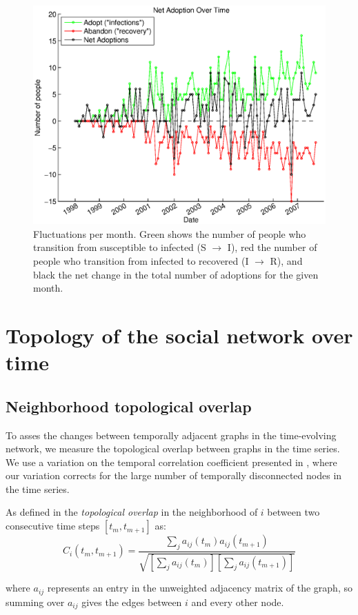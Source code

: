 \documentclass[12pt]{article}
\begin{document}
\begin{figure}[H]
\centering
\includegraphics[width = .7\textwidth]{Graficos/trans.eps}
\caption{Fluctuations per month. Green shows the number of people who transition from susceptible to infected (S \(\rightarrow\) I), red the number of people who transition from infected to recovered (I \(\rightarrow\) R), and black the net change in the total number of adoptions for the given month.}
\label{fig:trans}
\end{figure}

\section{Topology of the social network over time}

\subsection{Neighborhood topological overlap}

To asses the changes between temporally adjacent graphs in the time-evolving network, we measure the topological overlap between graphs in the time series. We use a variation on the temporal correlation coefficient presented in \cite{3}, where our variation corrects for the large number of temporally disconnected nodes in the time series.

As defined in \cite{3}  the \emph{topological overlap} in the neighborhood of \(i\) between two consecutive time steps \([t_m,t_{m+1}]\) as:
\begin{equation}
C_i(t_m,t_{m+1}) = \frac{ \sum_j a_{ij}(t_m)a_{ij}(t_{m+1})}{\sqrt{[ \sum_j a_{ij}(t_m)][ \sum_j a_{ij}(t_{m+1})]}}
\label{eq:Ci}
\end{equation}

where \(a_{ij}\) represents an entry in the unweighted adjacency matrix of the graph, so summing over \(a_{ij}\) gives the edges between \(i\) and every other node.
\end{document}

